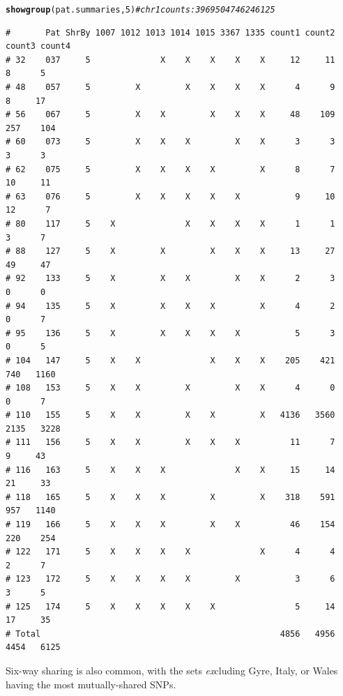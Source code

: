 \documentclass{article}\usepackage[]{graphicx}\usepackage[]{color}
\makeatletter
\newcommand{\hlnum}[1]{\textcolor[rgb]{0.686,0.059,0.569}{#1}}%
\newcommand{\hlcom}[1]{\textcolor[rgb]{0.678,0.584,0.686}{\textit{#1}}}%
\newcommand{\hlstd}[1]{\textcolor[rgb]{0.345,0.345,0.345}{#1}}%
\newcommand{\hlkwd}[1]{\textcolor[rgb]{0.737,0.353,0.396}{\textbf{#1}}}%
\newenvironment{kframe}{%
 \def\at@end@of@kframe{}%
 \ifinner\ifhmode%
  \def\at@end@of@kframe{\end{minipage}}%
  \begin{minipage}{\columnwidth}%
 \fi\fi%
 \def\FrameCommand##1{\hskip\@totalleftmargin \hskip-\fboxsep
 \colorbox{shadecolor}{##1}\hskip-\fboxsep
     \hskip-\linewidth \hskip-\@totalleftmargin \hskip\columnwidth}%
 \MakeFramed {\advance\hsize-\width
   \@totalleftmargin\z@ \linewidth\hsize
   \@setminipage}}%
 {\par\unskip\endMakeFramed%
 \at@end@of@kframe}
\newenvironment{knitrout}{}{} %
\makeatother
\begin{document}
\begin{knitrout}\footnotesize
{}\color{fgcolor}\begin{kframe}
\begin{alltt}
\hlkwd{showgroup}\hlstd{(pat.summaries,}\hlnum{5}\hlstd{)} \hlcom{# chr 1 counts: 3969   5047   4624  6125}
\end{alltt}
\begin{verbatim}
#       Pat ShrBy 1007 1012 1013 1014 1015 3367 1335 count1 count2 count3 count4
# 32    037     5              X    X    X    X    X     12     11      8      5
# 48    057     5         X         X    X    X    X      4      9      8     17
# 56    067     5         X    X         X    X    X     48    109    257    104
# 60    073     5         X    X    X         X    X      3      3      3      3
# 62    075     5         X    X    X    X         X      8      7     10     11
# 63    076     5         X    X    X    X    X           9     10     12      7
# 80    117     5    X              X    X    X    X      1      1      3      7
# 88    127     5    X         X         X    X    X     13     27     49     47
# 92    133     5    X         X    X         X    X      2      3      0      0
# 94    135     5    X         X    X    X         X      4      2      0      7
# 95    136     5    X         X    X    X    X           5      3      0      5
# 104   147     5    X    X              X    X    X    205    421    740   1160
# 108   153     5    X    X         X         X    X      4      0      0      7
# 110   155     5    X    X         X    X         X   4136   3560   2135   3228
# 111   156     5    X    X         X    X    X          11      7      9     43
# 116   163     5    X    X    X              X    X     15     14     21     33
# 118   165     5    X    X    X         X         X    318    591    957   1140
# 119   166     5    X    X    X         X    X          46    154    220    254
# 122   171     5    X    X    X    X              X      4      4      2      7
# 123   172     5    X    X    X    X         X           3      6      3      5
# 125   174     5    X    X    X    X    X                5     14     17     35
# Total                                                4856   4956   4454   6125
\end{verbatim}
\end{kframe}
\end{knitrout}

Six-way sharing is also common, with the sets \emph{ex}cluding Gyre, Italy, or Wales having the most mutually-shared SNPs.
\end{document}
